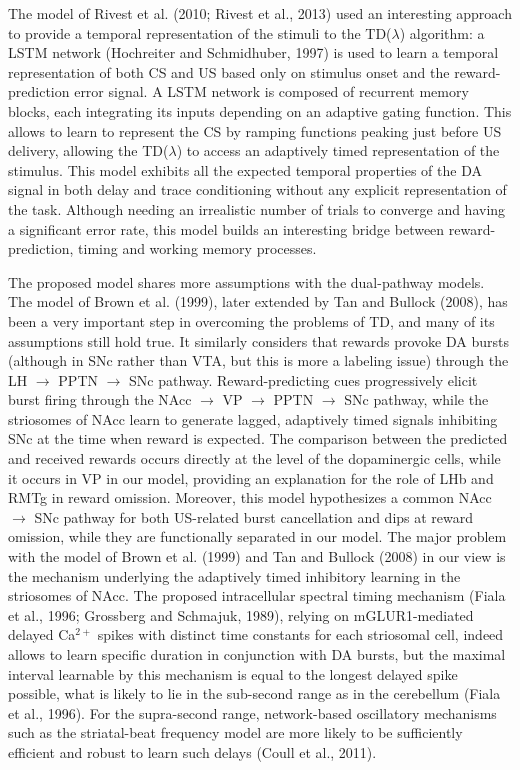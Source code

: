 \documentclass[
  11pt,
  a4paper,
]{scrbook}
\begin{document}
The model of Rivest et al. (2010; Rivest et al., 2013) used an
interesting approach to provide a temporal representation of the stimuli
to the TD(\(\lambda\)) algorithm: a LSTM network (Hochreiter and
Schmidhuber, 1997) is used to learn a temporal representation of both CS
and US based only on stimulus onset and the reward-prediction error
signal. A LSTM network is composed of recurrent memory blocks, each
integrating its inputs depending on an adaptive gating function. This
allows to learn to represent the CS by ramping functions peaking just
before US delivery, allowing the TD(\(\lambda\)) to access an adaptively
timed representation of the stimulus. This model exhibits all the
expected temporal properties of the DA signal in both delay and trace
conditioning without any explicit representation of the task. Although
needing an irrealistic number of trials to converge and having a
significant error rate, this model builds an interesting bridge between
reward-prediction, timing and working memory processes.

The proposed model shares more assumptions with the dual-pathway models.
The model of Brown et al. (1999), later extended by Tan and Bullock
(2008), has been a very important step in overcoming the problems of TD,
and many of its assumptions still hold true. It similarly considers that
rewards provoke DA bursts (although in SNc rather than VTA, but this is
more a labeling issue) through the LH \(\rightarrow\) PPTN
\(\rightarrow\) SNc pathway. Reward-predicting cues progressively elicit
burst firing through the NAcc \(\rightarrow\) VP \(\rightarrow\) PPTN
\(\rightarrow\) SNc pathway, while the striosomes of NAcc learn to
generate lagged, adaptively timed signals inhibiting SNc at the time
when reward is expected. The comparison between the predicted and
received rewards occurs directly at the level of the dopaminergic cells,
while it occurs in VP in our model, providing an explanation for the
role of LHb and RMTg in reward omission. Moreover, this model
hypothesizes a common NAcc \(\rightarrow\) SNc pathway for both
US-related burst cancellation and dips at reward omission, while they
are functionally separated in our model. The major problem with the
model of Brown et al. (1999) and Tan and Bullock (2008) in our view is
the mechanism underlying the adaptively timed inhibitory learning in the
striosomes of NAcc. The proposed intracellular spectral timing mechanism
(Fiala et al., 1996; Grossberg and Schmajuk, 1989), relying on
mGLUR1-mediated delayed Ca\(^{2+}\) spikes with distinct time constants
for each striosomal cell, indeed allows to learn specific duration in
conjunction with DA bursts, but the maximal interval learnable by this
mechanism is equal to the longest delayed spike possible, what is likely
to lie in the sub-second range as in the cerebellum (Fiala et al.,
1996). For the supra-second range, network-based oscillatory mechanisms
such as the striatal-beat frequency model are more likely to be
sufficiently efficient and robust to learn such delays (Coull et al.,
2011).
\end{document}
